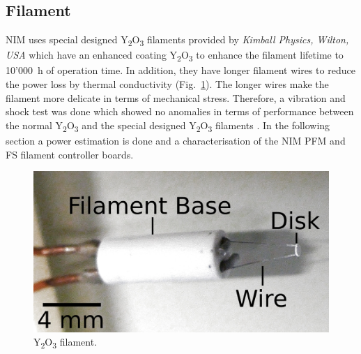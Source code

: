 	
	\subsection{Filament }
		
		NIM uses special designed Y\textsubscript{2}O\textsubscript{3} filaments provided by \textit{Kimball Physics, Wilton, USA} which have an enhanced coating Y\textsubscript{2}O\textsubscript{3} to enhance the filament lifetime to 10'000~h of operation time. In addition, they have longer filament wires to reduce the power loss by thermal conductivity (Fig.~\ref{fig:Y2O3Fil}). The longer wires make the filament more delicate in terms of mechanical stress. Therefore, a vibration and shock test was done which showed no anomalies in terms of performance between the normal Y\textsubscript{2}O\textsubscript{3} and the special designed Y\textsubscript{2}O\textsubscript{3} filaments \cite{Diss_Fausch}. In the following section a power estimation is done and a characterisation of the NIM PFM and FS filament controller boards.
		\begin{figure}[h]
			\centering
			\includegraphics[width=.5\textwidth]{Bilder/Y2O3_filament.png}
			\caption{Y\textsubscript{2}O\textsubscript{3} filament.}
			\label{fig:Y2O3Fil}
		\end{figure}
		

